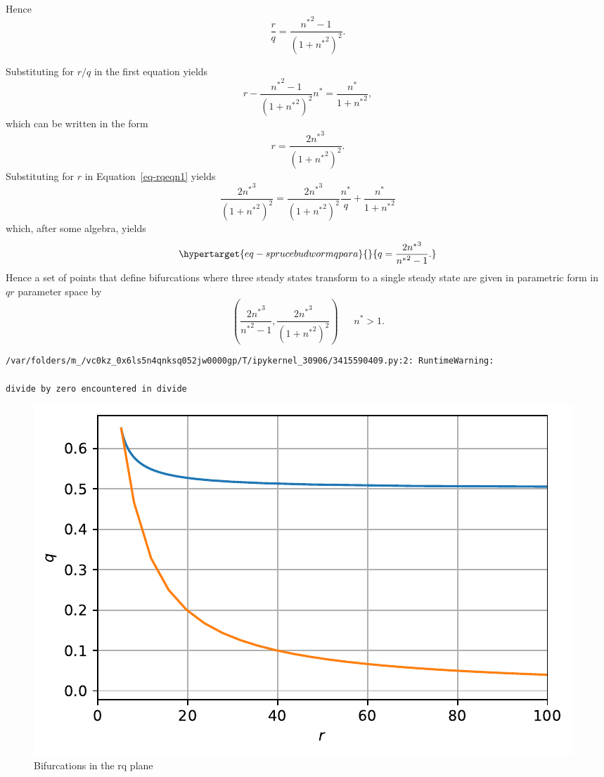 \documentclass[
  letterpaper,
  DIV=11,
  numbers=noendperiod]{scrreprt}
\begin{document}
Hence \[
   \frac{r}{q}= \frac{n{^*}^{2}-1}{(1+n{^*}^{2})^2}.
\]

Substituting for \(r/q\) in the first equation yields \[
r-\frac{n{^*}^{2}-1}{(1+n{^*}^{2})^2}n^*=\frac{n^*}{1+n{^*}^{2}},
\] which can be written in the form \[
r=\frac{2n{^*}^{3}}{(1+n{^*}^{2})^2}.
\] Substituting for \(r\) in Equation~\ref{eq-rqeqn1} yields \[
\frac{2n{^*}^{3}}{(1+n{^*}^{2})^2}=\frac{2n{^*}^{3}}{(1+n{^*}^{2})^2}\frac{n^*}{q}+\frac{n^*}{1+n{^*}^2}
\] which, after some algebra, yields
\begin{equation}\protect\hypertarget{eq-sprucebudwormqpara}{}{
q=\frac{2n{^*}^3}{n{^*}^{2}-1}.
}\label{eq-sprucebudwormqpara}\end{equation} Hence a set of points that
define bifurcations where three steady states transform to a single
steady state are given in parametric form in \(qr\) parameter space by
\[
\left(\frac{2n{^*}^3}{n{^*}^{2}-1},\frac{2n{^*}^{3}}{(1+n{^*}^{2})^2}\right) \ \ \ \ \ \ \ n^*>1.
\]

\begin{verbatim}
/var/folders/m_/vc0kz_0x6ls5n4qnksq052jw0000gp/T/ipykernel_30906/3415590409.py:2: RuntimeWarning:

divide by zero encountered in divide
\end{verbatim}

\begin{figure}

{\centering \includegraphics{SinglePopODEMOdels_files/figure-pdf/fig-sprucebudworm-rq-output-2.pdf}

}

\caption{\label{fig-sprucebudworm-rq}Bifurcations in the rq plane}

\end{figure}
\end{document}
